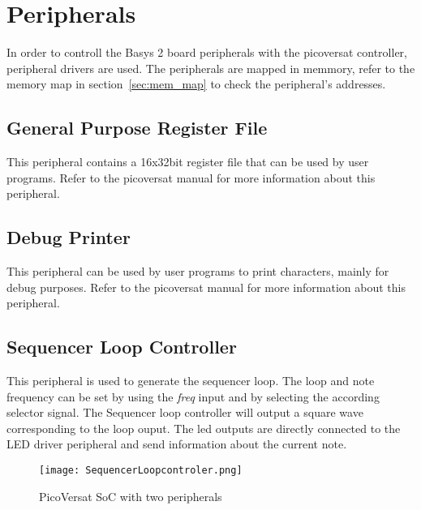 \section{Peripherals}
\label{sec:periphs}

In order to controll the Basys 2 board peripherals with the picoversat controller, peripheral drivers are used. The peripherals are mapped in memmory, refer to the memory map in section~\ref{sec:mem_map} to check the peripheral's addresses.

\subsection{General Purpose Register File}

This peripheral contains a 16x32bit register file that can be used by user
programs. Refer to the picoversat manual for more information about this peripheral. 

\subsection{Debug Printer}

This peripheral can be used by user programs to print characters, mainly for
debug purposes. Refer to the picoversat manual for more information about this peripheral.

\subsection{Sequencer Loop Controller}

This peripheral is used to generate the sequencer loop. The loop and note frequency can be set by using the \textit{freq} input and by selecting the according selector signal.
The Sequencer loop controller will output a square wave corresponding to the loop ouput. The led outputs are directly connected to the LED driver peripheral and send information about the current note. 

\begin{figure}[!htbp]
    \centerline{\texttt{[image: SequencerLoopcontroler.png]}}
    \vspace{0cm}\caption{PicoVersat SoC with two peripherals}
    \label{fig:periphs}
\end{figure}

